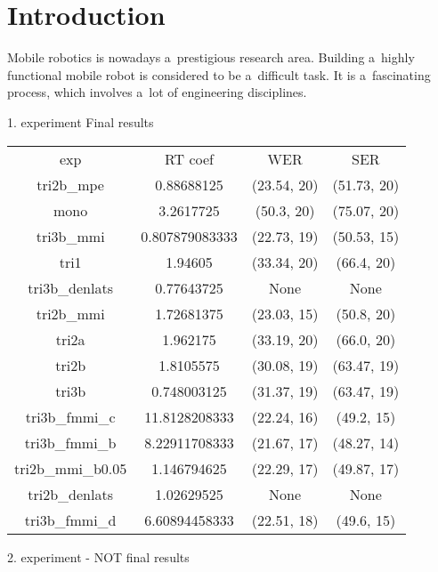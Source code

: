 \chapter{Introduction}
\label{chap:intro}
  Mobile robotics is nowadays a~prestigious research area. Building a~highly functional 
  mobile robot is considered to be a~difficult task. 
  It is a~fascinating process, which
  involves a~lot of engineering disciplines.
  

1. experiment Final results 

\begin{tabular}{cccc}
exp             & RT coef        & WER         & SER        \\
tri2b_mpe       & 0.88688125     & (23.54, 20) & (51.73, 20)\\
mono            & 3.2617725      & (50.3, 20)  & (75.07, 20)\\
tri3b_mmi       & 0.807879083333 & (22.73, 19) & (50.53, 15)\\
tri1            & 1.94605        & (33.34, 20) & (66.4, 20) \\
tri3b_denlats   & 0.77643725     & None        & None       \\
tri2b_mmi       & 1.72681375     & (23.03, 15) & (50.8, 20) \\
tri2a           & 1.962175       & (33.19, 20) & (66.0, 20) \\
tri2b           & 1.8105575      & (30.08, 19) & (63.47, 19)\\
tri3b           & 0.748003125    & (31.37, 19) & (63.47, 19)\\
tri3b_fmmi_c    & 11.8128208333  & (22.24, 16) & (49.2, 15) \\
tri3b_fmmi_b    & 8.22911708333  & (21.67, 17) & (48.27, 14)\\
tri2b_mmi_b0.05 & 1.146794625    & (22.29, 17) & (49.87, 17)\\
tri2b_denlats   & 1.02629525     & None        & None       \\
tri3b_fmmi_d    & 6.60894458333  & (22.51, 18) & (49.6, 15)
\end{tabular}


2. experiment - NOT final results


